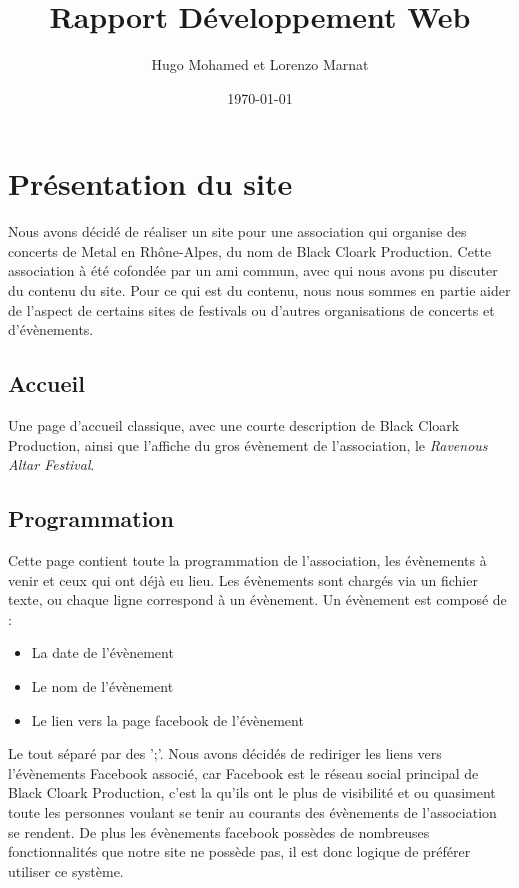 \documentclass[a4paper, 12pt]{article}
\title{Rapport Développement Web}
\author{Hugo Mohamed et Lorenzo Marnat}
\date{\today}
\begin{document}
\maketitle

\newpage

\tableofcontents

\newpage

\section{Présentation du site}
Nous avons décidé de réaliser un site pour une association qui organise des concerts de Metal en Rhône-Alpes, du nom de Black Cloark Production. Cette association à été cofondée par un ami commun, avec qui nous avons pu discuter du contenu du site.
Pour ce qui est du contenu, nous nous sommes en partie aider de l'aspect de certains sites de festivals ou d'autres organisations de concerts et d'évènements.

\subsection{Accueil}
Une page d'accueil classique, avec une courte description de Black Cloark Production, ainsi que l'affiche du gros évènement de l'association, le \textit{Ravenous Altar Festival}.

\subsection{Programmation}
Cette page contient toute la programmation de l'association, les évènements à venir et ceux qui ont déjà eu lieu. Les évènements sont chargés via un fichier texte, ou chaque ligne correspond à un évènement. Un évènement est composé de :
\begin{itemize}
\item La date de l'évènement
\item Le nom de l'évènement
\item Le lien vers la page facebook de l'évènement
\end{itemize}
Le tout séparé par des ';'.
Nous avons décidés de rediriger les liens vers l'évènements Facebook associé, car Facebook est le réseau social principal de Black Cloark Production, c'est la qu'ils ont le plus de visibilité et ou quasiment toute les personnes voulant se tenir au courants des évènements de l'association se rendent. De plus les évènements facebook possèdes de nombreuses fonctionnalités que notre site ne possède pas, il est donc logique de préférer utiliser ce système.
\end{document}
